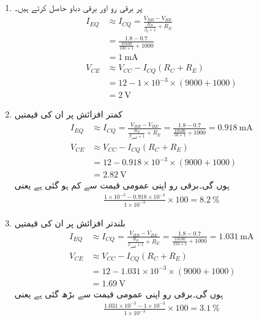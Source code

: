 \begin{enumerate}
\item
{} پر برقی رو اور برقی دباو حاصل کرتے ہیں۔
\begin{align*}
I_{EQ} &\approx I_{CQ} =\frac{V_{BB}-V_{BE}}{\frac{R_B}{\beta_0+1}+R_E}\\
&=\frac{1.8-0.7}{\frac{10100}{100+1}+1000}\\
&=\SI{1}{\milli \ampere}\\
V_{CE} &\approx V_{CC} -I_{CQ} \left (R_C+R_E \right ) \\
&=12-1 \times 10^{-3} \times \left (9000+1000 \right )\\
&=\SI{2}{\volt}
\end{align*}

\item
کمتر افزائش   پر ان کی قیمتیں
\begin{align*}
I_{EQ} &\approx I_{CQ} =\frac{V_{BB}-V_{BE}}{\frac{R_B}{\beta_\text{کمتر}+1}+R_E}=\frac{1.8-0.7}{\frac{10100}{50+1}+1000}=\SI{0.918}{\milli \ampere}\\
V_{CE} &\approx V_{CC} -I_{CQ} \left (R_C+R_E \right ) \\
&=12-0.918 \times 10^{-3} \times \left (9000+1000 \right )\\
&=\SI{2.82}{\volt}
\end{align*}
ہوں گی۔برقی رو اپنی عمومی قیمت سے   کم ہو گئی ہے یعنی
\begin{align*}
\frac{1 \times 10^{-3} -0.918 \times 10^{-3}}{1 \times 10^{-3}} \times 100 = \SI{8.2}{\percent}
\end{align*}

\item

بلندتر افزائش   پر ان کی قیمتیں
\begin{align*}
I_{EQ} & \approx I_{CQ} =\frac{V_{BB}-V_{BE}}{\frac{R_B}{\beta_\text{کمتر}+1}+R_E}=\frac{1.8-0.7}{\frac{10100}{150+1}+1000}=\SI{1.031}{\milli \ampere}\\
V_{CE} &\approx V_{CC} -I_{CQ} \left (R_C+R_E \right ) \\
&=12-1.031 \times 10^{-3} \times \left (9000+1000 \right )\\
&=\SI{1.69}{\volt} 
\end{align*}
ہوں گی۔برقی رو اپنی عمومی قیمت سے   بڑھ گئی ہے یعنی
\begin{align*}
\frac{1.031 \times 10^{-3} -1 \times 10^{-3}}{1 \times 10^{-3}} \times 100 = \SI{3.1}{\percent}
\end{align*}

\end{enumerate}

